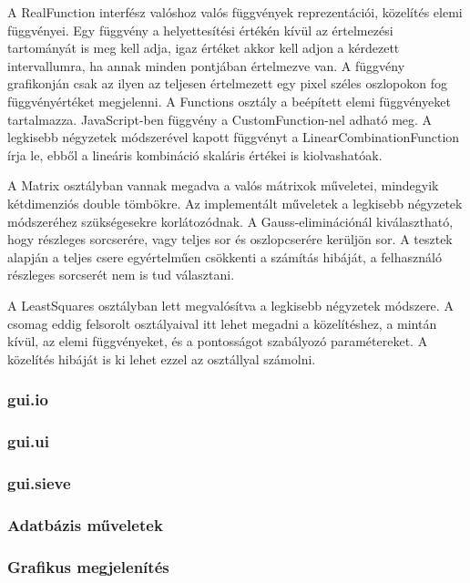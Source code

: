 A RealFunction interfész valóshoz valós függvények reprezentációi, közelítés elemi függvényei. Egy függvény a helyettesítési értékén kívül az értelmezési tartományát is meg kell adja, igaz értéket akkor kell adjon a kérdezett intervallumra, ha annak minden pontjában értelmezve van. A függvény grafikonján csak az ilyen az teljesen értelmezett egy pixel széles oszlopokon fog függvényértéket megjelenni. A Functions osztály a beépített elemi függvényeket tartalmazza.
JavaScript-ben függvény a CustomFunction-nel adható meg.
A legkisebb négyzetek módszerével kapott függvényt a LinearCombinationFunction írja le, ebből a lineáris kombináció skaláris értékei is kiolvashatóak.

A Matrix osztályban vannak megadva a valós mátrixok műveletei, mindegyik kétdimenziós double tömbökre.
Az implementált műveletek a legkisebb négyzetek módszeréhez szükségesekre korlátozódnak.
A Gauss-eliminációnál kiválasztható, hogy részleges sorcserére, vagy teljes sor és oszlopcserére kerüljön sor.
{\color{red}A tesztek alapján a teljes csere egyértelműen csökkenti a számítás hibáját, a felhasználó részleges sorcserét nem is tud választani.}

A LeastSquares osztályban lett megvalósítva a legkisebb négyzetek módszere. A csomag eddig felsorolt osztályaival itt lehet megadni a közelítéshez, a mintán kívül, az elemi függvényeket, és a pontosságot szabályozó paramétereket.
A közelítés hibáját is ki lehet ezzel az osztállyal számolni.

\subsubsection{gui.io}

\subsubsection{gui.ui}

\subsubsection{gui.sieve}

\subsubsection{Adatbázis műveletek}

\subsubsection{Grafikus megjelenítés}


